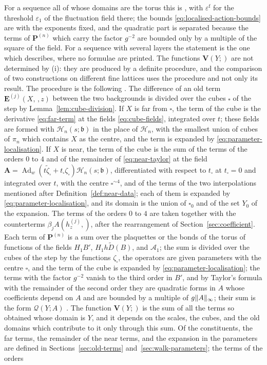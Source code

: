 \documentclass[11pt]{preprint}
\makeatletter
\newcommand{\Ad}{\operatorname{Ad}}
\DeclarePairedDelimiter{\norm}{\lVert}{\rVert}
\newcommand*{\bigcdot}{}%
\DeclareRobustCommand*{\bigcdot}{%
	\mathbin{\mathpalette\bigcdot@{}}%
}
\newcommand*{\bigcdot@scalefactor}{.7}
\newcommand*{\bigcdot@widthfactor}{1.15}
\newcommand*{\bigcdot@}[2]{%
	\sbox0{$#1\vcenter{}$}%
	\sbox2{$#1\cdot\m@th$}%
	\hbox to \bigcdot@widthfactor\wd2{%
		\hss
		\raise\ht0\hbox{%
			\scalebox{\bigcdot@scalefactor}{%
				\lower\ht0\hbox{$#1\bullet\m@th$}%
			}%
		}%
		\hss
	}%
}
\numberwithin{equation}{section}
\makeatother
\begin{document}
For a sequence all of whose domains are the torus this is \cite[Lemma~2, p.~11]{BalabanRG2}, with $\varepsilon^{\mathrm f}$ for the threshold $\varepsilon_1$ of the fluctuation field there; the bounds \eqref{eq:localised-action-bounds} are \cite[(1.36), (1.43)]{BalabanRG2} with the exponents fixed, and the quadratic part is separated because the terms of $\mathbf P^{(n)}$ which carry the factor $g^{-2}$ are bounded only by a multiple of the square of the field. For a sequence with several layers the statement is the one which \cite[pp.~275--276, (3.43)]{BalabanCRE} describes, where no formulae are printed. The functions $\mathbf V(Y; \bigcdot)$ are not determined by (i): they are produced by a definite procedure, and the comparison of two constructions on different fine lattices uses the procedure and not only its result. The procedure is the following \cite[pp.~8--11]{BalabanRG2}. The difference of an old term $\mathbf E^{(j)}(X, \bigcdot\,, z)$ between the two backgrounds is divided over the cubes $\square$ of the step by Lemma~\ref{lem:cube-division}. If $X$ is far from $\square$, the term of the cube is the derivative \eqref{eq:far-term} at the fields \eqref{eq:cube-fields}, integrated over $t$; these fields are formed with $\mathcal H_n(s; \mathfrak b)$ in the place of $\mathcal H_n$, with the smallest union of cubes of $\pi_n$ which contains $X$ as the centre, and the term is expanded by \eqref{eq:parameter-localisation}. If $X$ is near, the term of the cube is the sum of the terms of the orders $0$ to $4$ and of the remainder of \eqref{eq:near-taylor} at the field $\mathbf A = \Ad_w(t\tilde\zeta_\square + t_\square\zeta_\square)\mathcal H_n(s; \mathfrak b)$, differentiated with respect to $t_\square$ at $t_\square = 0$ and integrated over $t$, with the centre $\square^{\sim4}$, and of the terms of the two interpolations mentioned after Definition~\ref{def:near-data}; each of them is expanded by \eqref{eq:parameter-localisation}, and its domain is the union of $\square_0$ and of the set $Y_0$ of the expansion. The terms of the orders $0$ to $4$ are taken together with the counterterms $\beta_jA(h^{(j)}_z, \bigcdot)$, after the rearrangement of Section~\ref{sec:coefficient}. Each term of $\mathbf P^{(n)}$ is a sum over the plaquettes or the bonds of the torus of functions of the fields $H_1B'$, $H_1h\tilde D(B)$, and $\mathcal A_1$; the sum is divided over the cubes of the step by the functions $\zeta_\square$, the operators are given parameters with the centre $\square$, and the term of the cube is expanded by \eqref{eq:parameter-localisation}; the terms with the factor $g^{-2}$ vanish to the third order in $B'$, and by Taylor's formula with the remainder of the second order they are quadratic forms in $A$ whose coefficients depend on $A$ and are bounded by a multiple of $g\norm A_\infty$; their sum is the form $\mathcal Q(Y; A)$ \cite[(1.37)--(1.40)]{BalabanRG2}. The function $\mathbf V(Y; \bigcdot)$ is the sum of all the terms so obtained whose domain is $Y$, and it depends on the scales, the cubes, and the old domains which contribute to it only through this sum. Of the constituents, the far terms, the remainder of the near terms, and the expansion in the parameters are defined in Sections~\ref{sec:old-terms} and~\ref{sec:walk-parameters}; the terms of the orders 
\end{document}
